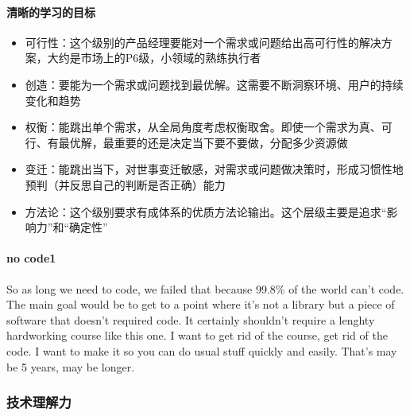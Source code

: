 \documentclass[letterpaper,11pt,english]{sphinxmanual}
\begin{document}
\paragraph{清晰的学习的目标}
\label{\detokenize{chapter_idea/goal:id1}}\begin{itemize}
\item {} 
可行性：这个级别的产品经理要能对一个需求或问题给出高可行性的解决方案，大约是市场上的P6级，小领域的熟练执行者

\item {} 
创造：要能为一个需求或问题找到最优解。这需要不断洞察环境、用户的持续变化和趋势

\item {} 
权衡：能跳出单个需求，从全局角度考虑权衡取舍。即使一个需求为真、可行、有最优解，最重要的还是决定当下要不要做，分配多少资源做

\item {} 
变迁：能跳出当下，对世事变迁敏感，对需求或问题做决策时，形成习惯性地预判（并反思自己的判断是否正确）能力

\item {} 
方法论：这个级别要求有成体系的优质方法论输出。这个层级主要是追求“影响力”和“确定性”

\end{itemize}


\paragraph{no code1\sphinxfootnotemark[131]}
\label{\detokenize{chapter_idea/goal:no-code1}}%
\begin{footnotetext}[131]\sphinxAtStartFootnote
{}
%
\end{footnotetext}\ignorespaces 
So as long we need to code, we failed that because 99.8\% of the world
can’t code. The main goal would be to get to a point where it’s not a
library but a piece of software that doesn’t required code. It certainly
shouldn’t require a lenghty hardworking course like this one. I want to
get rid of the course, get rid of the code. I want to make it so you can
do usual stuff quickly and easily. That’s may be 5 years, may be longer.


\subsubsection{技术理解力}
\label{\detokenize{chapter_idea/understand_tech:id1}}\label{\detokenize{chapter_idea/understand_tech::doc}}
\end{document}
